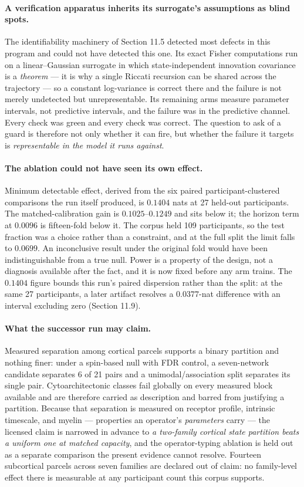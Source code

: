 \paragraph{A verification apparatus inherits its surrogate's assumptions as
blind spots.} The identifiability machinery of Section 11.5 detected most
defects in this program and could not have detected this one. Its exact Fisher
computations run on a linear--Gaussian surrogate in which state-independent
innovation covariance is a \emph{theorem} --- it is why a single Riccati
recursion can be shared across the trajectory --- so a constant log-variance is
correct there and the failure is not merely undetected but unrepresentable. Its
remaining arms measure parameter intervals, not predictive intervals, and the
failure was in the predictive channel. Every check was green and every check
was correct. The question to ask of a guard is therefore not only whether it
can fire, but whether the failure it targets is \emph{representable in the
model it runs against}.

\paragraph{The ablation could not have seen its own effect.}
Minimum detectable effect, derived from the six paired participant-clustered
comparisons the run itself produced, is \(0.1404\) nats at 27 held-out
participants. The matched-calibration gain is \(0.1025\)--\(0.1249\) and sits
below it; the horizon term at \(0.0096\) is fifteen-fold below it. The corpus
held 109 participants, so the test fraction was a choice rather than a
constraint, and at the full split the limit falls to \(0.0699\). An
inconclusive result under the original fold would have been indistinguishable
from a true null. Power is a property of the design, not a diagnosis available
after the fact, and it is now fixed before any arm trains. The \(0.1404\) figure
bounds this run's paired dispersion rather than the split: at the same 27
participants, a later artifact resolves a \(0.0377\)-nat difference with an
interval excluding zero (Section 11.9).

\paragraph{What the successor run may claim.}
Measured separation among cortical parcels supports a binary partition and
nothing finer: under a spin-based null with FDR control, a seven-network
candidate separates 6 of 21 pairs and a unimodal/association split separates
its single pair. Cytoarchitectonic classes fail globally on every measured
block available and are therefore carried as description and barred from
justifying a partition. Because that separation is measured on receptor
profile, intrinsic timescale, and myelin --- properties an operator's
\emph{parameters} carry --- the licensed claim is narrowed in advance to
\emph{a two-family cortical state partition beats a uniform one at matched
capacity}, and the operator-typing ablation is held out as a separate
comparison the present evidence cannot resolve. Fourteen subcortical parcels
across seven families are declared out of claim: no family-level effect there
is measurable at any participant count this corpus supports.

